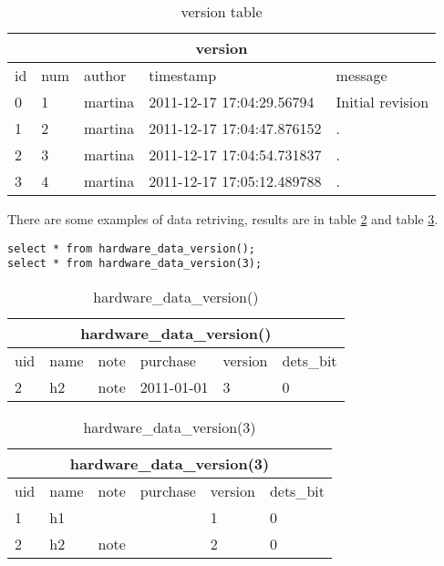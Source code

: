 \documentclass[deska]{subfiles}
\begin{document}
\begin{center}

\begin{table}
    \caption{version table}
    \label{tab-example-version}
\begin{tabular}{ | l | l | l | l | l |}
    \hline
    \multicolumn{5}{|c|}{version}\\
    \hline
    id & num & author & timestamp & message\\
    \hline
    0 & 1 & martina & 2011-12-17 17:04:29.56794 & Initial revision\\
    1 & 2 & martina & 2011-12-17 17:04:47.876152 & .\\
    2 & 3 & martina & 2011-12-17 17:04:54.731837 & .\\
    3 & 4 & martina & 2011-12-17 17:05:12.489788 & .\\
    \hline
\end{tabular}
\end{table}

\end{center}


There are some examples of data retriving, results are in table \ref{tab-select-hardware} and table \ref{tab-select-hardware-v3}.\\

\begin{verbatim}
select * from hardware_data_version();
select * from hardware_data_version(3);
\end{verbatim}

\begin{center}

\begin{table}
    \caption{hardware\_data\_version()}
    \label{tab-select-hardware}
\begin{tabular}{ | l | l | l | l | l | l |}
    \hline
    \multicolumn{6}{|c|}{hardware\_data\_version()}\\
    \hline
    uid & name & note & purchase & version & dets\_bit\\
    \hline
    2 & h2 & note & 2011-01-01 & 3 & 0\\
    \hline
\end{tabular}
\end{table}

\end{center}

\begin{center}

\begin{table}
    \caption{hardware\_data\_version(3)}
    \label{tab-select-hardware-v3}
\begin{tabular}{ | l | l | l | l | l | l |}
    \hline
    \multicolumn{6}{|c|}{hardware\_data\_version(3)}\\
    \hline
    uid & name & note & purchase & version & dets\_bit\\
    \hline
    1 & h1 &  &  & 1 & 0\\
    2 & h2 & note &  & 2 & 0\\
    \hline
\end{tabular}
\end{table}

\end{center}
\end{document}
